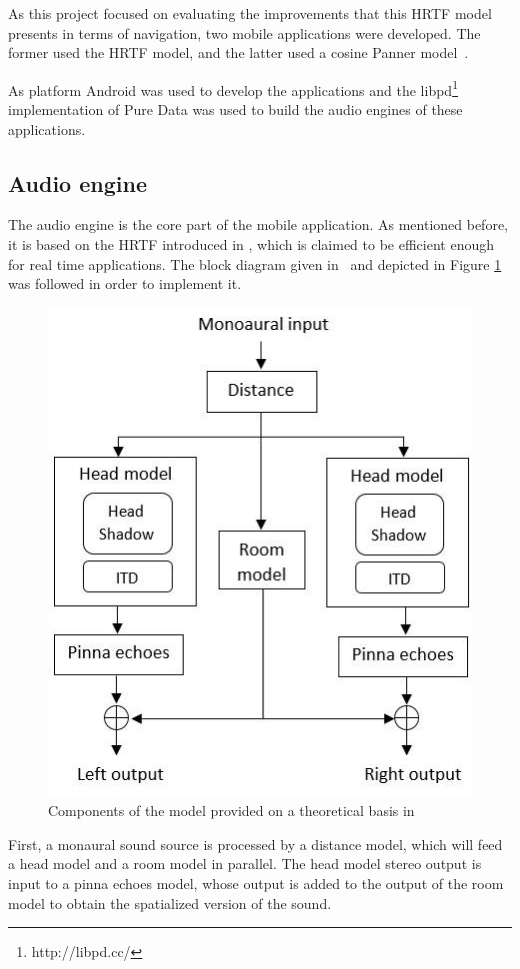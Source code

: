 \documentclass[journal]{IEEEtran}
\begin{document}
As this project focused on evaluating the improvements that this HRTF model presents in terms of navigation, two mobile applications were developed. The former used the HRTF model, and the latter used a cosine Panner model~\cite{AndyFarnell2010}. 

As platform Android was used to develop the applications and the libpd\footnote{http://libpd.cc/} implementation of Pure Data was used to build the audio engines of these applications.

\subsection{Audio engine}
The audio engine is the core part of the mobile application. As mentioned before, it is based on the HRTF introduced in \cite{Brown1997}, which is claimed to be efficient enough for real time applications. The block diagram given in~\cite{Brown1997} and depicted in Figure \ref{fig:workflow} was followed in order to implement it.

\begin{figure}[h!]
\centering
\includegraphics[scale=0.55]{graphics/graphic.jpg}
\caption{Components of the model provided on a theoretical basis in~\cite{Brown1997}}
\label{fig:workflow}
\end{figure}

First, a monaural sound source is processed by a distance model, which will feed a head model and a room model  in parallel. The head model stereo output is input to a pinna echoes model, whose output is added to the output of the room model to obtain the spatialized version of the sound.
\end{document}
